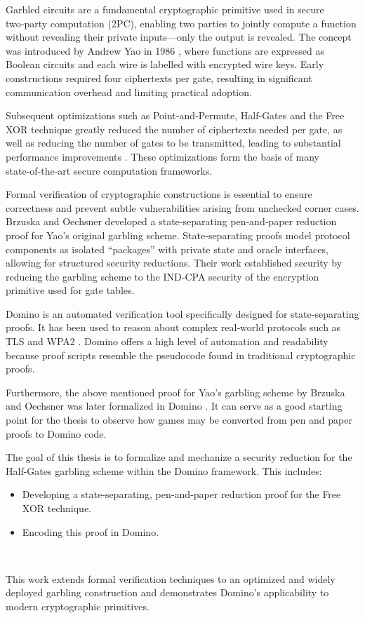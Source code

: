 \noindent%
Garbled circuits are a fundamental cryptographic primitive used in secure two‑party computation (2PC), enabling two parties to jointly compute a function without revealing their private inputs—only the output is revealed. The concept was introduced by Andrew Yao in 1986 \cite{FOCS:Yao86}, where functions are expressed as Boolean circuits and each wire is labelled with encrypted wire keys. Early constructions required four ciphertexts per gate, resulting in significant communication overhead and limiting practical adoption.

Subsequent optimizations such as Point‑and‑Permute, Half‑Gates and the Free {XOR} technique greatly reduced the number of ciphertexts needed per gate, as well as reducing the number of gates to be transmitted, leading to substantial performance improvements \cite{STOC:BeaMicRog90,EC:ZahRosEva15,kolesnikov_freexor_2008}. These optimizations form the basis of many state‑of‑the‑art secure computation frameworks.

Formal verification of cryptographic constructions is essential to ensure correctness and prevent subtle vulnerabilities arising from unchecked corner cases. Brzuska and Oechsner \cite{CSF:BrzOec23} developed a state‑separating pen‑and‑paper reduction proof for Yao’s original garbling scheme. State‑separating proofs model protocol components as isolated “packages” with private state and oracle interfaces, allowing for structured security reductions. Their work established security by reducing the garbling scheme to the IND‑CPA security of the encryption primitive used for gate tables.

Domino is an automated verification tool specifically designed for state‑separating proofs. It has been used to reason about complex real‑world protocols such as TLS \cite{rajabi_towards_2025} and WPA2 \cite{AC:BDEFKK22}. Domino offers a high level of automation and readability because proof scripts resemble the pseudocode found in traditional cryptographic proofs.

Furthermore, the above mentioned proof for Yao's garbling scheme by Brzuska and Oechsner \cite{CSF:BrzOec23} was later formalized in Domino \cite{brzuska-private-communication}. It can serve as a good starting point for the thesis to observe how games may be converted from pen and paper proofs to Domino code.

The goal of this thesis is to formalize and mechanize a security reduction for the Half-Gates garbling scheme within the Domino framework. This includes:
\begin{itemize}
    \item Developing a state‑separating, pen‑and‑paper reduction proof for the Free XOR technique.
    \item Encoding this proof in Domino.
\end{itemize} \

This work extends formal verification techniques to an optimized and widely deployed garbling construction and demonstrates Domino’s applicability to modern cryptographic primitives.

